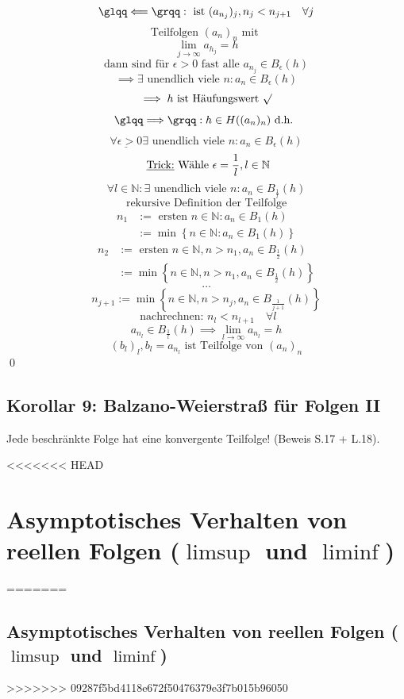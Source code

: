 \documentclass[fleqn]{scrbook}
\newcommand{\mqq}[1]{\text{\glqq} #1\text{\grqq}}
\renewenvironment{proof}{{\bfseries Beweis }}{\qed}
\begin{document}
\begin{proof}
  \[\mqq{\Longleftarrow}: \text{ ist } (a_{n_j})_j, n_j < n_{j+1} \quad \forall j\]
  \[\text{Teilfolgen } (a_n)_n \text{ mit } \]
  \[ \lim_{j \to \infty} a_{h_j} = h\]
  \[\text{dann sind für } \epsilon > 0 \text{ fast alle } a_{n_j} \in B_\epsilon(h)\]
  \[\implies \exists \text{ unendlich viele } n: a_n \in B_\epsilon(h)\]
  \[\implies h \text{ ist Häufungswert } \surd \]
  \[\mqq{\Longrightarrow}: h \in H((a_n)_n) \text{ d.h. }\]
  \[\underline{\forall \epsilon> 0} \exists \text{ unendlich viele } n: a_n \in B_\epsilon(h)\]
  \[\text{ \underline{Trick:} Wähle } \epsilon= \frac{1}{l}, l \in \mathbb{N}\]
  \[\forall l \in \mathbb{N}: \exists \text{ unendlich viele } n: a_n \in B_\frac{1}{l}(h)\]
  \[\text{rekursive Definition der Teilfolge}\]
  \[
    \begin{array}{ll}
      n_1 & := \text{ ersten } n \in \mathbb{N}: a_n \in B_1(h) \\
          & := \min\left\{n \in \mathbb{N}: a_n \in B_1(h) \right\}
    \end{array}
  \]
  \[
    \begin{array}{ll}
      n_2 & := \text{ ersten } n \in \mathbb{N}, n > n_1, a_n \in B_\frac{1}{2}(h) \\
          & := \min\left\{n \in \mathbb{N}, n > n_1, a_n \in B_\frac{1}{2}(h) \right\}
    \end{array}
  \]
  \[\ldots\]
  \[n_{j+1}:= \min\left\{n \in \mathbb{N}, n > n_j, a_n \in B_\frac{1}{j+1}(h)\right\}\]
  \[\text{ nachrechnen: } \boxed{n_l < n_{l+1}} \quad \forall l\]
  \[a_{n_l} \in B_\frac{1}{l}(h) \implies \lim_{l \to \infty} a_{n_l} = h\]
  \[(b_l)_l, b_l = a_{n_l} \text{ ist Teilfolge von } (a_n)_n\]
\end{proof}

\subsection{Korollar 9: Balzano-Weierstraß für Folgen II}

Jede beschränkte Folge hat eine konvergente Teilfolge! (Beweis S.17 + L.18).

<<<<<<< HEAD
\section{Asymptotisches Verhalten von reellen Folgen ($\limsup$ und $\liminf$)}
=======
\subsection{Asymptotisches Verhalten von reellen Folgen (\texorpdfstring{$\limsup$}{Limes superior} und \texorpdfstring{$\liminf$}{Limes inferior})}
>>>>>>> 09287f5bd4118e672f50476379e3f7b015b96050
\end{document}
